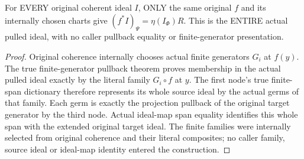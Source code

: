 \begin{theorem}
\label{hir:submersion-germ-colon-whole-pulled-stalk}
\leanok
For EVERY original coherent ideal $I$, ONLY the same original $f$ and its
internally chosen charts give
$(f^*I)_\Psi=\eta(I_\Phi)R$. This is the ENTIRE actual pulled ideal, with no
caller pullback equality or finite-generator presentation.
\end{theorem}
\begin{proof}
Original coherence internally chooses actual finite generators $G_i$ at
$f(y)$. The true finite-generator pullback theorem proves membership in the
actual pulled ideal exactly by the literal family $G_i\circ f$ at $y$.
The first node's true finite-span dictionary therefore represents its whole
source ideal by the actual germs of that family. Each germ is exactly the
projection pullback of the original target generator by the third node.
Actual ideal-map span equality identifies this whole span with the extended
original target ideal. The finite families were internally selected from
original coherence and their literal composites; no caller family, source
ideal or ideal-map identity entered the construction.
\end{proof}

